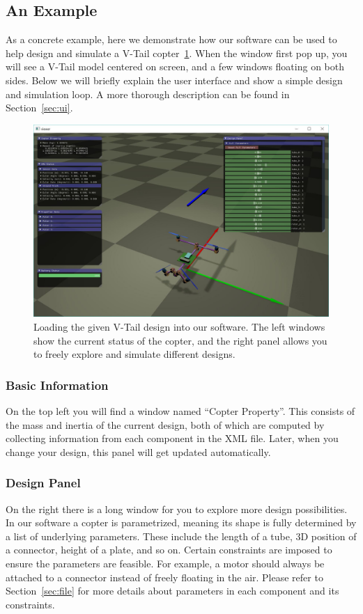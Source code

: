 \subsection{An Example}
As a concrete example, here we demonstrate how our software can be used to help design and simulate a V-Tail copter~\ref{fig:vtail_ui}. When the window first pop up, you will see a V-Tail model centered on screen, and a few windows floating on both sides. Below we will briefly explain the user interface and show a simple design and simulation loop. A more thorough description can be found in Section~\ref{sec:ui}.
\begin{figure}[!htb]
  \centering
  \includegraphics[width=0.9\linewidth]{vtail_ui}
  \caption{Loading the given V-Tail design into our software. The left windows show the current status of the copter, and the right panel allows you to freely explore and simulate different designs.}
  \label{fig:vtail_ui}
\end{figure}

\subsubsection{Basic Information}
On the top left you will find a window named ``Copter Property''. This consists of the mass and inertia of the current design, both of which are computed by collecting information from each component in the XML file. Later, when you change your design, this panel will get updated automatically.

\subsubsection{Design Panel}
On the right there is a long window for you to explore more design possibilities. In our software a copter is parametrized, meaning its shape is fully determined by a list of underlying parameters. These include the length of a tube, 3D position of a connector, height of a plate, and so on. Certain constraints are imposed to ensure the parameters are feasible. For example, a motor should always be attached to a connector instead of freely floating in the air. Please refer to Section~\ref{sec:file} for more details about parameters in each component and its constraints.

